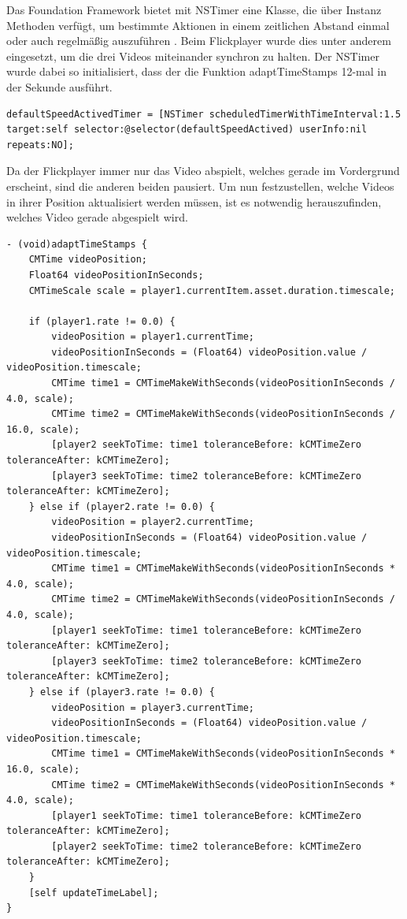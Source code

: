 \documentclass[11pt,a4paper]{report}
\begin{document}
Das Foundation Framework bietet mit NSTimer eine Klasse, die über Instanz Methoden verfügt, um bestimmte Aktionen in einem zeitlichen Abstand einmal oder auch regelmäßig auszuführen \cite{NSTimerClass}. Beim Flickplayer wurde dies unter anderem eingesetzt, um die drei Videos miteinander synchron zu halten. Der NSTimer wurde dabei so initialisiert, dass der die Funktion adaptTimeStamps 12-mal in der Sekunde ausführt.
\begin{lstlisting}
defaultSpeedActivedTimer = [NSTimer scheduledTimerWithTimeInterval:1.5 target:self selector:@selector(defaultSpeedActived) userInfo:nil repeats:NO];
\end{lstlisting}
Da der Flickplayer immer nur das Video abspielt, welches gerade im Vordergrund erscheint, sind die anderen beiden pausiert. Um nun festzustellen, welche Videos in ihrer Position aktualisiert werden müssen, ist es notwendig herauszufinden, welches Video gerade abgespielt wird.
\begin{lstlisting}
- (void)adaptTimeStamps {
	CMTime videoPosition;
	Float64 videoPositionInSeconds;
	CMTimeScale scale = player1.currentItem.asset.duration.timescale;
	
	if (player1.rate != 0.0) {
		videoPosition = player1.currentTime; 
		videoPositionInSeconds = (Float64) videoPosition.value / videoPosition.timescale;
		CMTime time1 = CMTimeMakeWithSeconds(videoPositionInSeconds / 4.0, scale);
		CMTime time2 = CMTimeMakeWithSeconds(videoPositionInSeconds / 16.0, scale);
		[player2 seekToTime: time1 toleranceBefore: kCMTimeZero toleranceAfter: kCMTimeZero];
		[player3 seekToTime: time2 toleranceBefore: kCMTimeZero toleranceAfter: kCMTimeZero];        
	} else if (player2.rate != 0.0) {
		videoPosition = player2.currentTime; 
		videoPositionInSeconds = (Float64) videoPosition.value / videoPosition.timescale;
		CMTime time1 = CMTimeMakeWithSeconds(videoPositionInSeconds * 4.0, scale);
		CMTime time2 = CMTimeMakeWithSeconds(videoPositionInSeconds / 4.0, scale);
		[player1 seekToTime: time1 toleranceBefore: kCMTimeZero toleranceAfter: kCMTimeZero];
		[player3 seekToTime: time2 toleranceBefore: kCMTimeZero toleranceAfter: kCMTimeZero];        
	} else if (player3.rate != 0.0) {
		videoPosition = player3.currentTime;  
		videoPositionInSeconds = (Float64) videoPosition.value / videoPosition.timescale;
		CMTime time1 = CMTimeMakeWithSeconds(videoPositionInSeconds * 16.0, scale);
		CMTime time2 = CMTimeMakeWithSeconds(videoPositionInSeconds * 4.0, scale);
		[player1 seekToTime: time1 toleranceBefore: kCMTimeZero toleranceAfter: kCMTimeZero];
		[player2 seekToTime: time2 toleranceBefore: kCMTimeZero toleranceAfter: kCMTimeZero];
	}
	[self updateTimeLabel];
}
\end{lstlisting}
\end{document}
